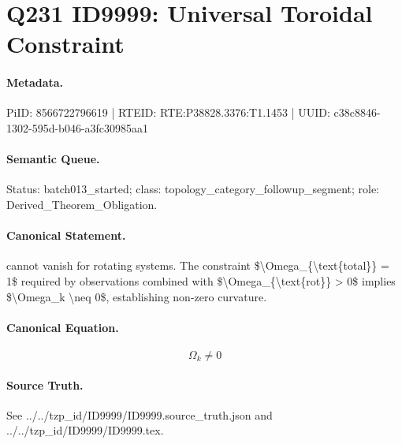 \section*{Q231 ID9999: Universal Toroidal Constraint}
\paragraph{Metadata.}
PiID: 8566722796619 | RTEID: RTE:P38828.3376:T1.1453 | UUID: c38c8846-1302-595d-b046-a3fc30985aa1

\paragraph{Semantic Queue.}
Status: batch013\_started; class: topology\_category\_followup\_segment; role: Derived\_Theorem\_Obligation.

\paragraph{Canonical Statement.}
cannot vanish for rotating systems. The constraint \$\textbackslash{}Omega\_\{\textbackslash{}text\{total\}\} = 1\$ required by observations combined with \$\textbackslash{}Omega\_\{\textbackslash{}text\{rot\}\} > 0\$ implies \$\textbackslash{}Omega\_k \textbackslash{}neq 0\$, establishing non-zero curvature.

\paragraph{Canonical Equation.}
\[
\Omega_k \neq 0
\]

\paragraph{Source Truth.}
See ../../tzp\_id/ID9999/ID9999.source\_truth.json and ../../tzp\_id/ID9999/ID9999.tex.
